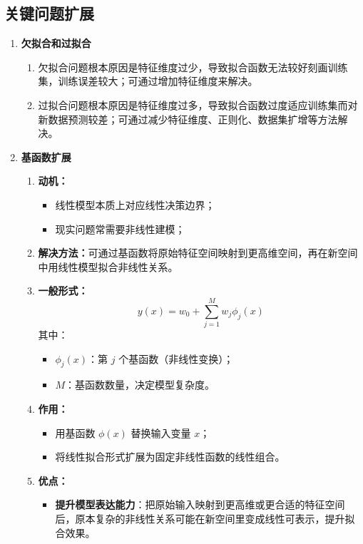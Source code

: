 \documentclass[../main.tex]{subfiles}
\begin{document}
\subsection{关键问题扩展}\label{sec:linear-key-issues}
\begin{enumerate}
    \item \textbf{欠拟合和过拟合}
    \begin{enumerate}
        \item 欠拟合问题根本原因是特征维度过少，导致拟合函数无法较好刻画训练集，训练误差较大；可通过增加特征维度来解决。
        \item 过拟合问题根本原因是特征维度过多，导致拟合函数过度适应训练集而对新数据预测较差；可通过减少特征维度、正则化、数据集扩增等方法解决。
    \end{enumerate}

    \item \textbf{基函数扩展}
    \begin{enumerate}
        \item \textbf{动机：}
        \begin{itemize}
            \item 线性模型本质上对应线性决策边界；
            \item 现实问题常需要非线性建模；
        \end{itemize}

        \item \textbf{解决方法：}可通过基函数将原始特征空间映射到更高维空间，再在新空间中用线性模型拟合非线性关系。
        
        \item \textbf{一般形式：}
        $$
        y(x)=w_0+\sum_{j=1}^{M}w_j\phi_j(x)
        $$
        其中：
        \begin{itemize}
            \item $\phi_j(x)$：第 $j$ 个基函数（非线性变换）；
            \item $M$：基函数数量，决定模型复杂度。
        \end{itemize}

        \item \textbf{作用：}
        \begin{itemize}
            \item 用基函数 $\phi(x)$ 替换输入变量 $x$；
            \item 将线性拟合形式扩展为固定非线性函数的线性组合。
        \end{itemize}

        \item \textbf{优点：}
        \begin{itemize}
            \item \textbf{提升模型表达能力}：把原始输入映射到更高维或更合适的特征空间后，原本复杂的非线性关系可能在新空间里变成线性可表示，提升拟合效果。


\end{itemize}
\end{enumerate}
\end{enumerate}
\end{document}
